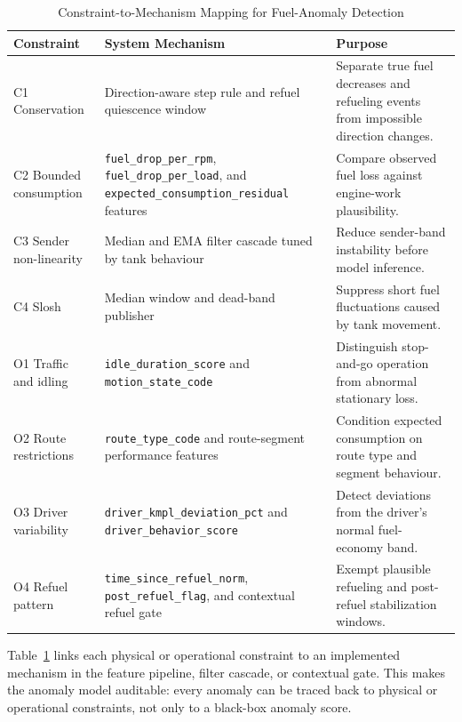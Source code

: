 \begin{table}[!htbp]
\centering
\caption{Constraint-to-Mechanism Mapping for Fuel-Anomaly Detection}
\label{tab:constraint_mechanism_mapping}
\scriptsize
\setlength{\tabcolsep}{3pt}
\renewcommand{\arraystretch}{1.15}
\begin{tabularx}{\textwidth}{|p{}|X|X|}
\hline
\textbf{Constraint} & \textbf{System Mechanism} & \textbf{Purpose} \\
\hline
C1 Conservation & Direction-aware step rule and refuel quiescence window & Separate true fuel decreases and refueling events from impossible direction changes. \\
\hline
C2 Bounded consumption & \texttt{fuel\_drop\_per\_rpm}, \texttt{fuel\_drop\_per\_load}, and \texttt{expected\_consumption\_residual} features & Compare observed fuel loss against engine-work plausibility. \\
\hline
C3 Sender non-linearity & Median and EMA filter cascade tuned by tank behaviour & Reduce sender-band instability before model inference. \\
\hline
C4 Slosh & Median window and dead-band publisher & Suppress short fuel fluctuations caused by tank movement. \\
\hline
O1 Traffic and idling & \texttt{idle\_duration\_score} and \texttt{motion\_state\_code} & Distinguish stop-and-go operation from abnormal stationary loss. \\
\hline
O2 Route restrictions & \texttt{route\_type\_code} and route-segment performance features & Condition expected consumption on route type and segment behaviour. \\
\hline
O3 Driver variability & \texttt{driver\_kmpl\_deviation\_pct} and \texttt{driver\_behavior\_score} & Detect deviations from the driver's normal fuel-economy band. \\
\hline
O4 Refuel pattern & \texttt{time\_since\_refuel\_norm}, \texttt{post\_refuel\_flag}, and contextual refuel gate & Exempt plausible refueling and post-refuel stabilization windows. \\
\hline
\end{tabularx}
\normalsize
\end{table}

Table~\ref{tab:constraint_mechanism_mapping} links each physical or operational constraint to an implemented mechanism in the feature pipeline, filter cascade, or contextual gate. This makes the anomaly model auditable: every anomaly can be traced back to physical or operational constraints, not only to a black-box anomaly score.

